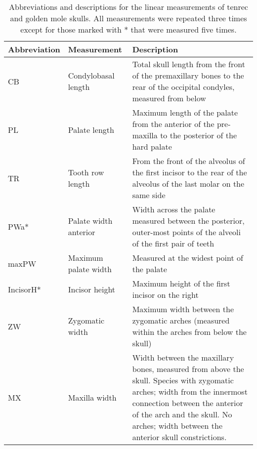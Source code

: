 \begin{center}
\begin{longtable} {p{} p{} p{}}
\caption[Skull measurements] {Abbreviations and descriptions for the linear measurements of tenrec and golden mole skulls. All measurements were repeated three times except for those marked with * that were measured five times.}\\
\hline
\textbf{Abbreviation} & \textbf{Measurement} & \textbf{Description}\\
\hline
CB & Condylobasal length & Total skull length from the front of the premaxillary  bones to the rear of the occipital condyles, measured from below\\
PL & Palate length & Maximum length of the palate from the anterior of the pre-maxilla to the posterior of the hard palate\\
TR & Tooth row length & From the front of the alveolus of the first incisor to the rear of the alveolus of the last molar on the same side\\
PWa* & Palate width anterior & Width across the palate measured between the posterior, outer-most points of the alveoli of the first pair of teeth\\
maxPW & Maximum palate width & Measured at the widest point of the palate\\
IncisorH* & Incisor height & Maximum height of the first incisor on the right\\
ZW & Zygomatic width & Maximum width between the zygomatic arches (measured within the arches from below the skull)\\
MX & Maxilla width & Width between the maxillary bones, measured from above the skull. Species with zygomatic arches; width from the innermost connection between the anterior of the arch and the skull. No arches; width between the anterior skull constrictions.\\ 

\end{longtable}
\end{center}
